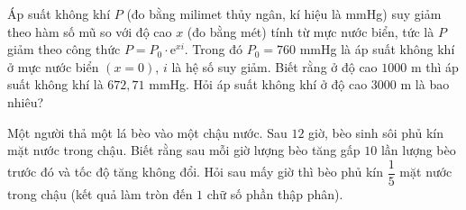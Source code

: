 \begin{vd}%
	Áp suất không khí $P$ (đo bằng milimet thủy ngân, kí hiệu là mmHg) suy giảm theo hàm số mũ so với độ cao $x$ (đo bằng mét) tính từ mực nước biển, tức là $P$ giảm theo công thức $P=P_0\cdot\mathrm{e}^{xi}$. Trong đó $P_0=760$ mmHg là áp suất không khí ở mực nước biển $(x=0)$, $i$ là hệ số suy giảm. Biết rằng ở độ cao $1000$ m thì áp suất không khí là $672{,}71$ mmHg. Hỏi áp suất không khí ở độ cao $3000$ m là bao nhiêu?
\end{vd}

\begin{vd}%
	Một người thả một lá bèo vào một chậu nước. Sau $12$ giờ, bèo sinh sôi phủ kín mặt nước trong chậu. Biết rằng sau mỗi giờ lượng bèo tăng gấp $10$ lần lượng bèo trước đó và tốc độ tăng không đổi. Hỏi sau mấy giờ thì bèo phủ kín $\dfrac{1}{5}$ mặt nước trong chậu (kết quả làm tròn đến $1$ chữ số phần thập phân).
	
\end{vd}
